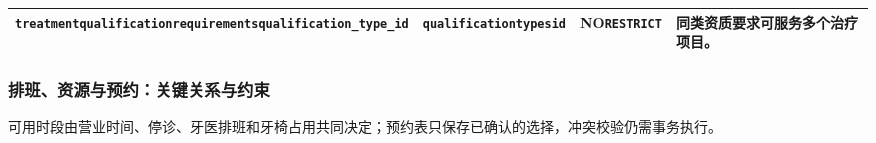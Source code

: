 \begin{longtable}{@{}L{43mm}L{32mm}L{24mm}L{49mm}@{}}
\texttt{treatment}\newline\texttt{qualification}\newline\texttt{requirements}\newline\texttt{qualification\_type\_id} & \texttt{qualification}\newline\texttt{types}\newline\texttt{id} & NO\newline\texttt{RESTRICT} & 同类资质要求可服务多个治疗项目。\\
\bottomrule\end{longtable}\endgroup


\subsubsection{排班、资源与预约：关键关系与约束}
可用时段由营业时间、停诊、牙医排班和牙椅占用共同决定；预约表只保存已确认的选择，冲突校验仍需事务执行。

